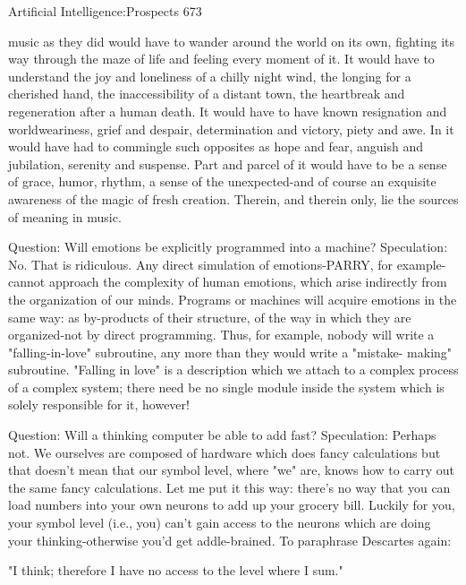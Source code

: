 Artificial Intelligence:Prospects                                                        673

    music as they did would have to wander around the world on its own, fighting its
    way through the maze of life and feeling every moment of it. It would have to
    understand the joy and loneliness of a chilly night wind, the longing for a cherished
    hand, the inaccessibility of a distant town, the heartbreak and regeneration after a
    human death. It would have to have known resignation and worldweariness, grief
    and despair, determination and victory, piety and awe. In it would have had to
    commingle such opposites as hope and fear, anguish and jubilation, serenity and
    suspense. Part and parcel of it would have to be a sense of grace, humor, rhythm, a
    sense of the unexpected-and of course an exquisite awareness of the magic of fresh
    creation. Therein, and therein only, lie the sources of meaning in music.

Question: Will emotions be explicitly programmed into a machine?
  Speculation: No. That is ridiculous. Any direct simulation of emotions-PARRY, for
     example-cannot approach the complexity of human emotions, which arise
     indirectly from the organization of our minds. Programs or machines will acquire
     emotions in the same way: as by-products of their structure, of the way in which
     they are organized-not by direct programming. Thus, for example, nobody will
     write a "falling-in-love" subroutine, any more than they would write a "mistake-
     making" subroutine. "Falling in love" is a description which we attach to a complex
     process of a complex system; there need be no single module inside the system
     which is solely responsible for it, however!

Question: Will a thinking computer be able to add fast?
  Speculation: Perhaps not. We ourselves are composed of hardware which does fancy
     calculations but that doesn't mean that our symbol level, where "we" are, knows
     how to carry out the same fancy calculations. Let me put it this way: there's no way
     that you can load numbers into your own neurons to add up your grocery bill.
     Luckily for you, your symbol level (i.e., you) can't gain access to the neurons which
     are doing your thinking-otherwise you'd get addle-brained. To paraphrase Descartes
     again:

                            "I think; therefore I have no access
                                 to the level where I sum."

